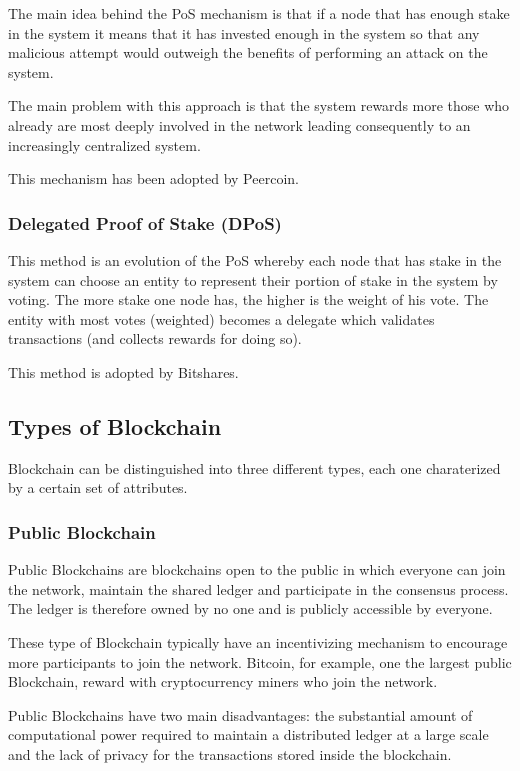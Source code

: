 The main idea behind the PoS mechanism is that if a node that has enough stake in
the system it means that it has invested enough in the system so that any
malicious attempt would outweigh the benefits of performing an attack on the
system.

The main problem with this approach is that the system rewards more those who
already are most deeply involved in the network leading consequently to an
increasingly centralized system.

This mechanism has been adopted by Peercoin.

\subsubsection{Delegated Proof of Stake (DPoS)} This method is an evolution of
the PoS whereby each node that has stake in the system can choose an entity to
represent their portion of stake in the system by voting. The more stake one
node has, the higher is the weight of his vote. The entity with most votes
(weighted) becomes a delegate which validates transactions (and collects rewards
for doing so).

This method is adopted by Bitshares.

\subsection{Types of Blockchain}
Blockchain can be distinguished into three different types, each one charaterized
by a certain set of attributes.
\subsubsection*{Public Blockchain}
Public Blockchains are blockchains open to the public in which everyone can join
the network, maintain the shared ledger and participate in the consensus process.
The ledger is therefore owned by no one and is publicly accessible by everyone.

These type of Blockchain typically have an incentivizing mechanism to encourage
more participants to join the network. Bitcoin, for example, one the largest public
Blockchain, reward with cryptocurrency miners who join the network.

Public Blockchains have two main disadvantages: the substantial amount of
computational power required to maintain a distributed ledger at a large scale
and the lack of privacy for the transactions stored inside the blockchain.

